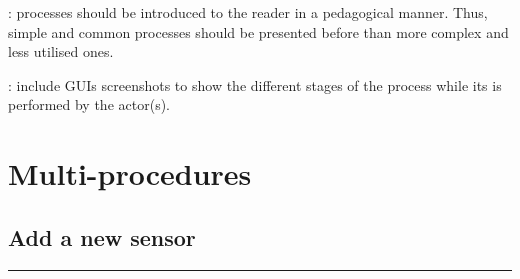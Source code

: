 : processes should be introduced to the
reader in a pedagogical manner. Thus, simple and common processes should be presented before
than more complex and less utilised ones.

: include GUIs screenshots to show the
different stages of the process while its is performed by the actor(s).






\section{Multi-procedures}

\subsection{Add a new sensor}
\vspace{0.5cm}
\hfill
\hrule
